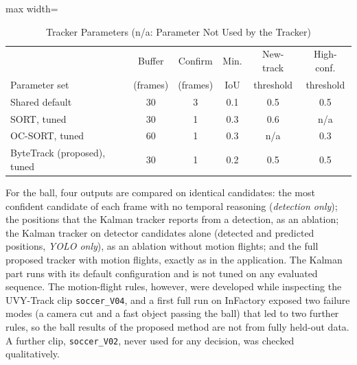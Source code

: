\documentclass[conference]{IEEEtran}
\begin{document}
\begin{table}[t]
\caption{Tracker Parameters (n/a: Parameter Not Used by the Tracker)}
\label{tab:params}
\centering
\footnotesize
\setlength{\tabcolsep}{3pt}
\begin{adjustbox}{max width=\columnwidth}
\begin{tabular}{@{}lccccc@{}}
\toprule
 & Buffer & Confirm & Min. & New-track & High-conf. \\
Parameter set & (frames) & (frames) & IoU & threshold & threshold \\
\midrule
Shared default & 30 & 3 & 0.1 & 0.5 & 0.5 \\
\midrule
SORT, tuned & 30 & 1 & 0.3 & 0.6 & n/a \\
OC-SORT, tuned & 60 & 1 & 0.3 & n/a & 0.3 \\
ByteTrack (proposed), tuned & 30 & 1 & 0.2 & 0.5 & 0.5 \\
\bottomrule
\end{tabular}
\end{adjustbox}
\end{table}

For the ball, four outputs are compared on identical candidates: the most
confident candidate of each frame with no temporal reasoning (\emph{detection
only}); the positions that the Kalman tracker reports from a detection, as an
ablation; the Kalman tracker on detector candidates alone (detected and predicted
positions, \emph{YOLO only}), as an ablation without motion flights; and the full
proposed tracker with motion flights, exactly as in the application. The Kalman
part runs with its default configuration and is not tuned on any evaluated
sequence. The motion-flight rules, however, were developed while inspecting the
UVY-Track clip \texttt{soccer\_V04}, and a first full run on InFactory exposed two
failure modes (a camera cut and a fast object passing the ball) that led to two
further rules, so the ball results of the proposed method are not from fully
held-out data. A further clip, \texttt{soccer\_V02}, never used for any decision,
was checked qualitatively.
\end{document}
